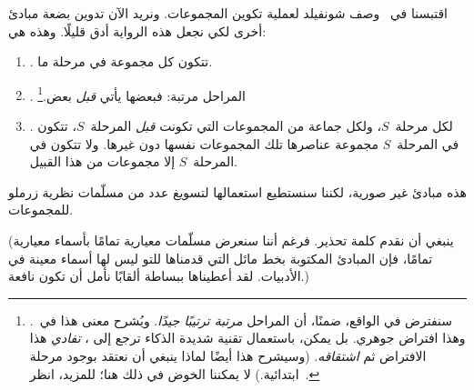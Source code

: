 \documentclass[../../../include/open-logic-section]{subfiles}
\begin{document}
	
اقتبسنا في~ وصف شونفيلد لعملية تكوين
المجموعات. ونريد الآن تدوين بضعة مبادئ أخرى لكي نجعل هذه الرواية أدق
قليلًا. وهذه هي:
\begin{enumerate}
\item[] \stageshier. تتكون كل مجموعة في مرحلة ما.
\item[] \stagesord. المراحل مرتبة: فبعضها يأتي \emph{قبل}
بعض.\footnote{سنفترض في الواقع، ضمنًا، أن المراحل \emph{مرتبة
  ترتيبًا جيدًا}. ويُشرح معنى هذا في~.
  وهذا افتراض جوهري. بل يمكن، باستعمال تقنية شديدة الذكاء ترجع إلى
  \citet{Scott1974}، \emph{تفادي} هذا الافتراض ثم \emph{اشتقاقه}.
  (وسيشرح هذا أيضًا لماذا ينبغي أن نعتقد بوجود مرحلة ابتدائية.) لا
  يمكننا الخوض في ذلك هنا؛ للمزيد، انظر~\citet{ButtonLT1}.}
\item[] \stagesacc. لكل مرحلة~$S$، ولكل جماعة من المجموعات التي تكونت
  \emph{قبل} المرحلة~$S$، تتكون في المرحلة~$S$ مجموعة عناصرها تلك المجموعات نفسها
  دون غيرها. ولا تتكون في المرحلة~$S$ إلا مجموعات من هذا القبيل.
\end{enumerate}
هذه مبادئ غير صورية، لكننا سنستطيع استعمالها لتسويغ عدد من مسلّمات
نظرية زرملو للمجموعات.

(ينبغي أن نقدم كلمة تحذير. فرغم أننا سنعرض مسلّمات معيارية تمامًا
بأسماء معيارية تمامًا، فإن المبادئ المكتوبة بخط مائل التي قدمناها للتو
ليس لها أسماء معينة في الأدبيات. لقد أعطيناها ببساطة ألقابًا نأمل أن
تكون نافعة.)
\end{document}
